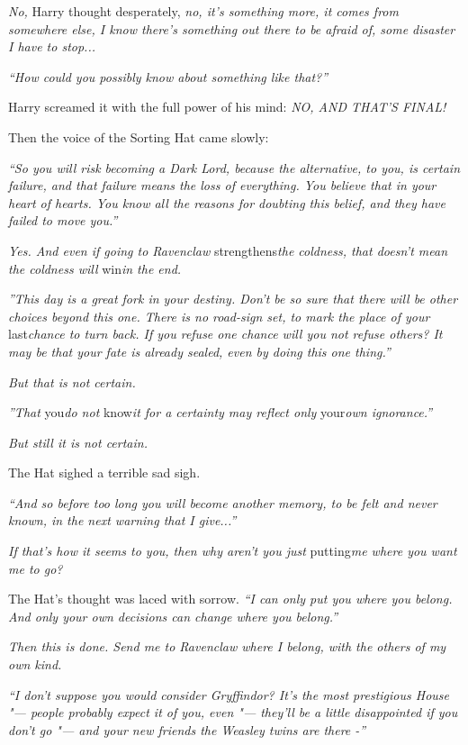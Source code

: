 \emph{No,} Harry thought desperately, \emph{no, it's something more, it
comes from somewhere else, I know there's something out there to be
afraid of, some disaster I have to stop...}

\emph{``How could you possibly know about something like that?''}

Harry screamed it with the full power of his mind: \emph{NO, AND THAT'S
FINAL!}

Then the voice of the Sorting Hat came slowly:

\emph{``So you will risk becoming a Dark Lord, because the alternative,
to you, is certain failure, and that failure means the loss of
everything. You believe that in your heart of hearts. You know all the
reasons for doubting this belief, and they have failed to move you.''}

\emph{Yes. And even if going to Ravenclaw} strengthens\emph{the
coldness, that doesn't mean the coldness will} win\emph{in the end.}

\emph{''This day is a great fork in your destiny. Don't be so sure that
there will be other choices beyond this one. There is no road-sign set,
to mark the place of your} last\emph{chance to turn back. If you refuse
one chance will you not refuse others? It may be that your fate is
already sealed, even by doing this one thing.''}

\emph{But that is not certain.}

\emph{''That} you\emph{do not} know\emph{it for a certainty may reflect
only} your\emph{own ignorance.''}

\emph{But still it is not certain.}

The Hat sighed a terrible sad sigh.

\emph{``And so before too long you will become another memory, to be
felt and never known, in the next warning that I give...''}

\emph{If that's how it seems to you, then why aren't you just}
putting\emph{me where you want me to go?}

The Hat's thought was laced with sorrow. \emph{``I can only put you
where you belong. And only your own decisions can change where you
belong.''}

\emph{Then this is done. Send me to Ravenclaw where I belong, with the
others of my own kind.}

\emph{``I don't suppose you would consider Gryffindor? It's the most
prestigious House "--- people probably expect it of you, even "--- they'll be
a little disappointed if you don't go "--- and your new friends the Weasley
twins are there -''}

